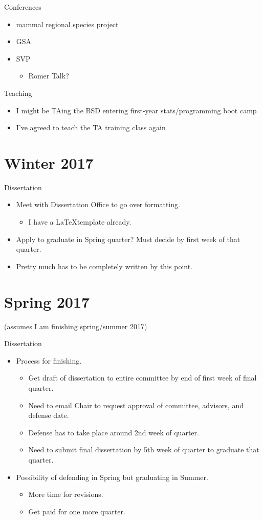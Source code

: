 \documentclass{article}
\begin{document}
Conferences
\begin{itemize}
  \item mammal regional species project
  \item GSA
  \item SVP
    \begin{itemize}
      \item Romer Talk?
    \end{itemize}
\end{itemize}

Teaching
\begin{itemize}
  \item I might be TAing the BSD entering first-year stats/programming boot camp
  \item I've agreed to teach the TA training class again
\end{itemize}


\section{Winter 2017}
Dissertation
\begin{itemize}
  \item Meet with Dissertation Office to go over formatting. 
    \begin{itemize}
      \item I have a \LaTeX template already.
    \end{itemize}
  \item Apply to graduate in Spring quarter? Must decide by first week of that quarter.
  \item Pretty much has to be completely written by this point.
\end{itemize}


\section{Spring 2017} 
(assumes I am finishing spring/summer 2017)

Dissertation
\begin{itemize}
  \item Process for finishing.
    \begin{itemize}
      \item Get draft of dissertation to entire committee by end of first week of final quarter.
      \item Need to email Chair to request approval of committee, advisors, and defense date.
      \item Defense has to take place around 2nd week of quarter.
      \item Need to submit final dissertation by 5th week of quarter to graduate that quarter.
    \end{itemize}
  \item Possibility of defending in Spring but graduating in Summer.
    \begin{itemize}
      \item More time for revisions.
      \item Get paid for one more quarter.
    \end{itemize}
\end{itemize}
\end{document}
